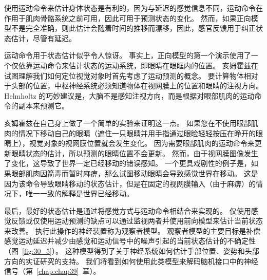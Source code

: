 使用运动命令来估计身体状态是有利的，因为与延迟的感觉信息不同，运动命令在作用于肌肉骨骼系统之前可用，因此可用于预测状态的变化。
然而，如果正向模型不是完全准确，则此估计会随着时间的推移而漂移，因此，感官反馈用于纠正状态估计，尽管有延迟。


运动命令用于状态估计似乎令人惊讶。
事实上，正向模型的第一个演示使用了一个仅依靠运动命令来估计状态的运动系统，即眼睛在眼眶内的位置。
亥姆霍兹在试图理解我们如何定位视觉对象时首先考虑了运动预测的概念。
要计算物体相对于头部的位置，中枢神经系统必须知道物体在视网膜上的位置和眼睛的注视方向。
Helmholtz 的巧妙建议是，大脑不是感知注视方向，而是根据对眼部肌肉的运动命令的副本来预测它。


亥姆霍兹在自己身上做了一个简单的实验来证明这一点。 如果您在不使用眼部肌肉的情况下移动自己的眼睛（遮住一只眼睛并用手指通过眼睑轻轻按压在睁开的眼睛上），视觉对象的视网膜位置就会发生变化。
因为需要眼部肌肉的运动命令来更新眼睛状态的估计，所以预测的眼睛位置不会更新。
然而，由于视网膜图像发生了变化，这导致了世界一定已经移动的错误感知。
一个更具戏剧性的例子是，如果眼部肌肉因箭毒而暂时麻痹，那么试图移动眼睛会导致感觉世界在移动。
这是因为该命令导致眼睛移动的状态估计，但是在固定的视网膜输入（由于麻痹）的情况下，唯一一致的解释是世界已经移动。


最后，最好的状态估计是通过将感觉方式与运动命令相结合来实现的。
仅使用感觉反馈或仅使用运动预测的缺点可以通过监视两者并使用前向模型来估计当前状态来改善。
执行此操作的神经装置称为观察者模型。
观察者模型的主要目标是补偿感觉运动延迟并减少由感觉和运动信号中的噪声引起的当前状态估计的不确定性（图~\ref{fig:30_5}）。
这种模型得到了关于神经系统如何估计手部位置、姿势和头部方向的实证研究的支持。
我们将看到如何使用此类模型来解码脑机接口中的神经信号（第~\ref{chap:chap39}~章）。


